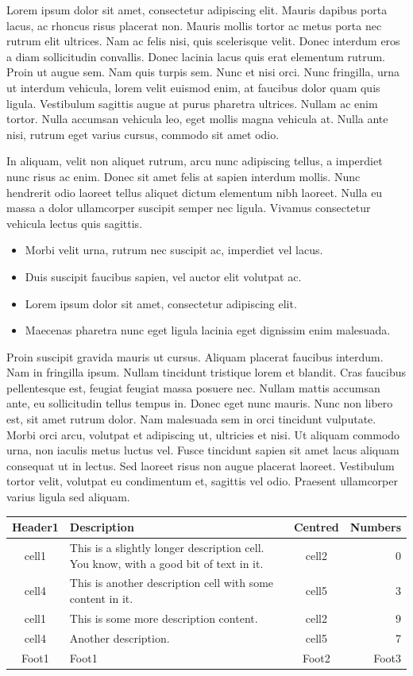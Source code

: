 \documentclass[11pt,oneside,openany]{book}
\begin{document}
Lorem ipsum dolor sit amet, consectetur adipiscing elit. Mauris dapibus porta lacus, ac rhoncus risus placerat non. Mauris mollis tortor ac metus porta nec rutrum elit ultrices. Nam ac felis nisi, quis scelerisque velit. Donec interdum eros a diam sollicitudin convallis. Donec lacinia lacus quis erat elementum rutrum. Proin ut augue sem. Nam quis turpis sem. Nunc et nisi orci. Nunc fringilla, urna ut interdum vehicula, lorem velit euismod enim, at faucibus dolor quam quis ligula. Vestibulum sagittis augue at purus pharetra ultrices. Nullam ac enim tortor. Nulla accumsan vehicula leo, eget mollis magna vehicula at. Nulla ante nisi, rutrum eget varius cursus, commodo sit amet odio.

In aliquam, velit non aliquet rutrum, arcu nunc adipiscing tellus, a imperdiet nunc risus ac enim. Donec sit amet felis at sapien interdum mollis. Nunc hendrerit odio laoreet tellus aliquet dictum elementum nibh laoreet. Nulla eu massa a dolor ullamcorper suscipit semper nec ligula. Vivamus consectetur vehicula lectus quis sagittis.

\begin{itemize}
\item Morbi velit urna, rutrum nec suscipit ac, imperdiet vel lacus.
\item Duis suscipit faucibus sapien, vel auctor elit volutpat ac.
\item Lorem ipsum dolor sit amet, consectetur adipiscing elit.
\item Maecenas pharetra nunc eget ligula lacinia eget dignissim enim malesuada.
\end{itemize}

Proin suscipit gravida mauris ut cursus. Aliquam placerat faucibus interdum. Nam in fringilla ipsum. Nullam tincidunt tristique lorem et blandit. Cras faucibus pellentesque est, feugiat feugiat massa posuere nec. Nullam mattis accumsan ante, eu sollicitudin tellus tempus in. Donec eget nunc mauris. Nunc non libero est, sit amet rutrum dolor. Nam malesuada sem in orci tincidunt vulputate. Morbi orci arcu, volutpat et adipiscing ut, ultricies et nisi. Ut aliquam commodo urna, non iaculis metus luctus vel. Fusce tincidunt sapien sit amet lacus aliquam consequat ut in lectus. Sed laoreet risus non augue placerat laoreet. Vestibulum tortor velit, volutpat eu condimentum et, sagittis vel odio. Praesent ullamcorper varius ligula sed aliquam.

\begin{longtable}{|c|p{}|c|r|}   %
\hline
Header1 & Description & Centred & Numbers\\
\hline
cell1 & This is a slightly longer description cell. You know, with a good bit of text in it. & cell2 & 0\\
cell4 & This is another description cell with some content in it. & cell5 & 3\\
cell1 & This is some more description content. & cell2 & 9\\
cell4 & Another description. & cell5 & 7\\
\hline \hline 
Foot1 & Foot1 & Foot2 & Foot3\\
\hline
\end{longtable}   %
\end{document}
